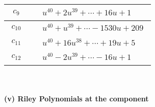 \documentclass[1p]{elsarticle_modified}
\theoremstyle{definition}
\begin{document}
\begin{tabular}{m{50pt}|m{274pt}}
\hline $$\begin{aligned}c_{9}\end{aligned}$$&$\begin{aligned}
&u^{40}+2 u^{39}+\cdots+16 u+1
\end{aligned}$\\
\hline $$\begin{aligned}c_{10}\end{aligned}$$&$\begin{aligned}
&u^{40}+u^{39}+\cdots-1530 u+209
\end{aligned}$\\
\hline $$\begin{aligned}c_{11}\end{aligned}$$&$\begin{aligned}
&u^{40}+16 u^{38}+\cdots+19 u+5
\end{aligned}$\\
\hline $$\begin{aligned}c_{12}\end{aligned}$$&$\begin{aligned}
&u^{40}-2 u^{39}+\cdots-16 u+1
\end{aligned}$\\
\hline
\end{tabular}\\~\\
\newpage\renewcommand{\arraystretch}{1}
\flushleft \textbf{(v) Riley Polynomials at the component}\newline \\
\end{document}
